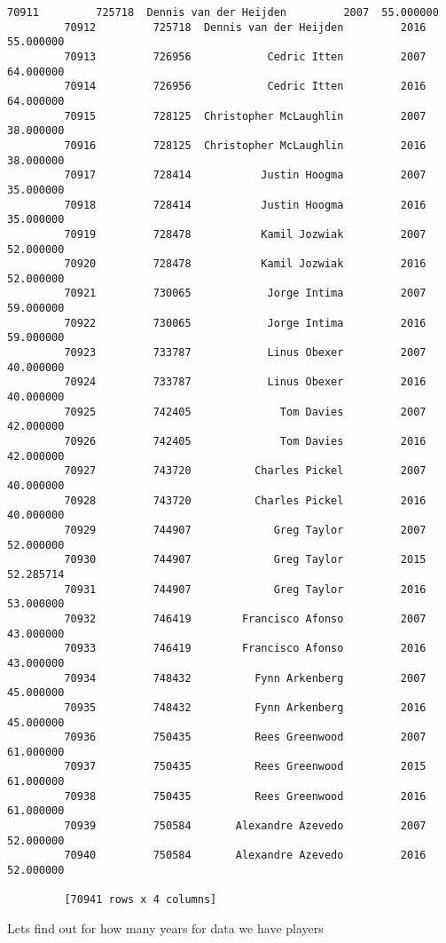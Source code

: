 \documentclass[11pt]{article}
\begin{document}
\begin{Verbatim}[commandchars=\\\{\}]
         70911         725718  Dennis van der Heijden         2007  55.000000
         70912         725718  Dennis van der Heijden         2016  55.000000
         70913         726956            Cedric Itten         2007  64.000000
         70914         726956            Cedric Itten         2016  64.000000
         70915         728125  Christopher McLaughlin         2007  38.000000
         70916         728125  Christopher McLaughlin         2016  38.000000
         70917         728414           Justin Hoogma         2007  35.000000
         70918         728414           Justin Hoogma         2016  35.000000
         70919         728478           Kamil Jozwiak         2007  52.000000
         70920         728478           Kamil Jozwiak         2016  52.000000
         70921         730065            Jorge Intima         2007  59.000000
         70922         730065            Jorge Intima         2016  59.000000
         70923         733787            Linus Obexer         2007  40.000000
         70924         733787            Linus Obexer         2016  40.000000
         70925         742405              Tom Davies         2007  42.000000
         70926         742405              Tom Davies         2016  42.000000
         70927         743720          Charles Pickel         2007  40.000000
         70928         743720          Charles Pickel         2016  40.000000
         70929         744907             Greg Taylor         2007  52.000000
         70930         744907             Greg Taylor         2015  52.285714
         70931         744907             Greg Taylor         2016  53.000000
         70932         746419        Francisco Afonso         2007  43.000000
         70933         746419        Francisco Afonso         2016  43.000000
         70934         748432          Fynn Arkenberg         2007  45.000000
         70935         748432          Fynn Arkenberg         2016  45.000000
         70936         750435          Rees Greenwood         2007  61.000000
         70937         750435          Rees Greenwood         2015  61.000000
         70938         750435          Rees Greenwood         2016  61.000000
         70939         750584       Alexandre Azevedo         2007  52.000000
         70940         750584       Alexandre Azevedo         2016  52.000000
         
         [70941 rows x 4 columns]
\end{Verbatim}
            
    Lets find out for how many years for data we have players
\end{document}
